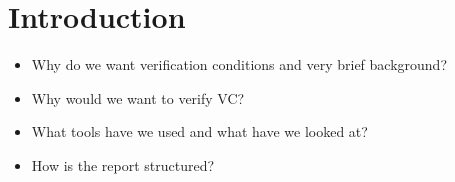 \section{Introduction}

\begin{itemize}
\item Why do we want verification conditions and very brief background?
\item Why would we want to verify VC?
\item What tools have we used and what have we looked at?
\item How is the report structured?
\end{itemize}